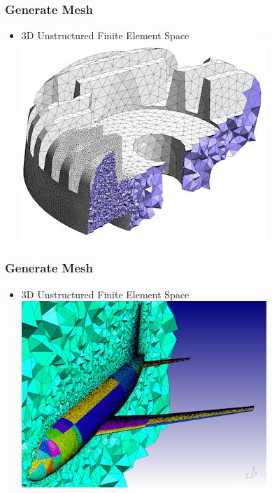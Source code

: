 \documentclass[10pt]{beamer}
\begin{document}
  \begin{frame}
    \frametitle{Generate Mesh}
    \begin{itemize}
      \item 3D Unstructured Finite Element Space
          \includegraphics[scale=0.6]{Figures/3Dmesh}
    \end{itemize}
  \end{frame}

  \begin{frame}
    \frametitle{Generate Mesh}
    \begin{itemize}
      \item 3D Unstructured Finite Element Space
          \includegraphics[scale=0.6]{Figures/3Dmesh2}
    \end{itemize}
  \end{frame}
\end{document}
